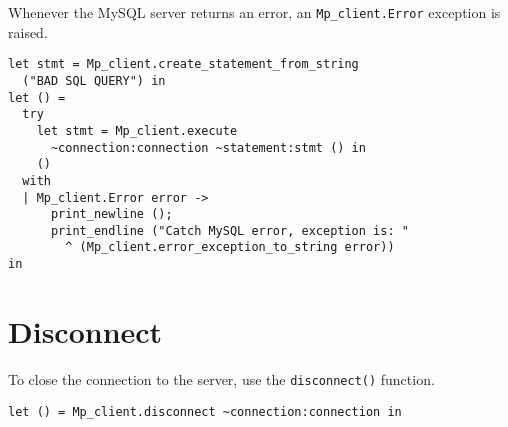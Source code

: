 \documentclass[a4paper, english, 11pt]{article}
\begin{document}
Whenever the MySQL server returns an error, an \texttt{Mp\_client.Error} exception is raised.

\begin{verbatim}
let stmt = Mp_client.create_statement_from_string 
  ("BAD SQL QUERY") in
let () =
  try
    let stmt = Mp_client.execute
      ~connection:connection ~statement:stmt () in 
    ()
  with
  | Mp_client.Error error ->
      print_newline ();
      print_endline ("Catch MySQL error, exception is: " 
        ^ (Mp_client.error_exception_to_string error))
in
\end{verbatim}

\section{Disconnect}

To close the connection to the server, use the \texttt{disconnect()} function.

\begin{verbatim}
let () = Mp_client.disconnect ~connection:connection in
\end{verbatim}
\end{document}
